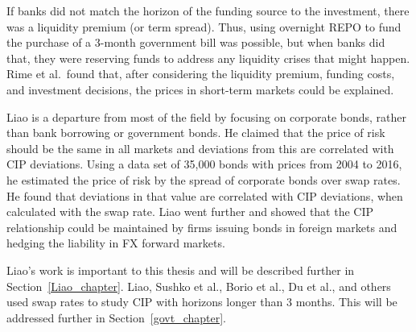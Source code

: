 If banks did not match the horizon of the funding source to the investment, there was a liquidity premium (or term spread).  Thus, using overnight REPO to fund the purchase of a 3-month government bill was possible, but when banks did that, they were reserving funds to address any liquidity crises that might happen.  Rime et al.\ found that, after considering the liquidity premium, funding costs, and investment decisions, the prices in short-term markets could be explained. 

Liao\cite{Liao2016} is a departure from most of the field by focusing on corporate bonds, rather than bank borrowing or government bonds.  He claimed that the price of risk should be the same in all markets and deviations from this are correlated with CIP deviations.  Using a data set of 35,000 bonds with prices from 2004 to 2016, he estimated the price of risk by the spread of corporate bonds over swap rates.  He found that deviations in that value are correlated with CIP deviations, when calculated with the swap rate.  Liao went further and showed that the CIP relationship could be maintained by firms issuing bonds in foreign markets and hedging the liability in FX forward markets.

Liao's work is important to this thesis and will be described further in Section~\ref{Liao_chapter}.  Liao, Sushko et al., Borio et al., Du et al., and others used swap rates to study CIP with horizons longer than 3 months.  This will be addressed further in Section~\ref{govt_chapter}.










